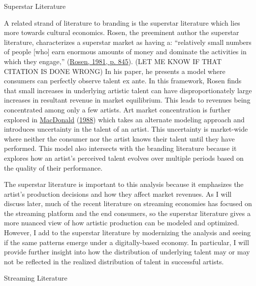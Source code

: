 \documentclass[
]{article}
\begin{document}
Superstar Literature

A related strand of literature to branding is the superstar literature
which lies more towards cultural economics. Rosen, the preeminent author
the superstar literature, characterizes a superstar market as having a:
``relatively small numbers of people {[}who{]} earn enormous amounts of
money and dominate the activities in which they engage,''
(\protect\hyperlink{ref-rosenEconomicsSuperstars1981a}{Rosen, 1981, p.
845}). (LET ME KNOW IF THAT CITATION IS DONE WRONG) In his paper, he
presents a model where consumers can perfectly observe talent ex ante.
In this framework, Rosen finds that small increases in underlying
artistic talent can have disproportionately large increases in resultant
revenue in market equilibrium. This leads to revenues being concentrated
among only a few artists. Art market concentration is further explored
in \protect\hyperlink{ref-macdonaldEconomicsRisingStars1988}{MacDonald}
(\protect\hyperlink{ref-macdonaldEconomicsRisingStars1988}{1988}) which
takes an alternate modeling approach and introduces uncertainty in the
talent of an artist. This uncertainty is market-wide where neither the
consumer nor the artist knows their talent until they have performed.
This model also intersects with the branding literature because it
explores how an artist's perceived talent evolves over multiple periods
based on the quality of their performance.

The superstar literature is important to this analysis because it
emphasizes the artist's production decisions and how they affect market
revenues. As I will discuss later, much of the recent literature on
streaming economies has focused on the streaming platform and the end
consumers, so the superstar literature gives a more nuanced view of how
artistic production can be modeled and optimized. However, I add to the
superstar literature by modernizing the analysis and seeing if the same
patterns emerge under a digitally-based economy. In particular, I will
provide further insight into how the distribution of underlying talent
may or may not be reflected in the realized distribution of talent in
successful artists.

Streaming Literature
\end{document}
